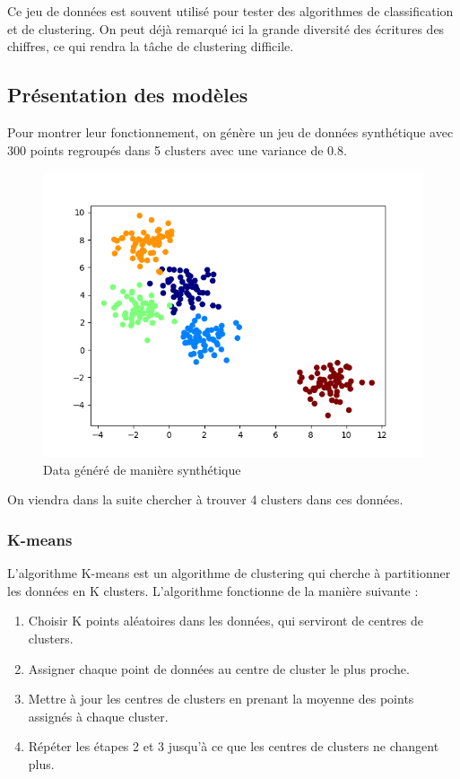 \documentclass[french,a4paper,18pt]{article}
\begin{document}
Ce jeu de données est souvent utilisé pour tester des algorithmes de classification et de clustering.
On peut déjà remarqué ici la grande diversité des écritures des chiffres, ce qui rendra la tâche de clustering difficile.

\subsection{Présentation des modèles}
Pour montrer leur fonctionnement, on génère un jeu de données synthétique avec 300 points regroupés dans 5 clusters avec une variance de 0.8.
\begin{figure}[h]
    \centering
    \includegraphics[scale=0.5]{images/short_simulation_generate_data.png}
    \caption{Data généré de manière synthétique}\label{fig:short_simulation_data}
\end{figure}

On viendra dans la suite chercher à trouver 4 clusters dans ces données.

\subsubsection{K-means}

L'algorithme K-means est un algorithme de clustering qui cherche à partitionner les données en K clusters.
L'algorithme fonctionne de la manière suivante :
\begin{enumerate}
    \item Choisir K points aléatoires dans les données, qui serviront de centres de clusters.
    \item Assigner chaque point de données au centre de cluster le plus proche.
    \item Mettre à jour les centres de clusters en prenant la moyenne des points assignés à chaque cluster.
    \item Répéter les étapes 2 et 3 jusqu'à ce que les centres de clusters ne changent plus.
\end{enumerate}
\end{document}
